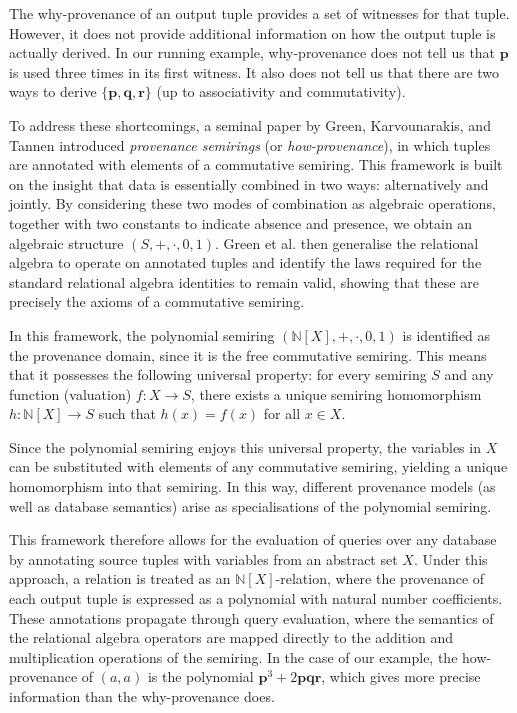 \documentclass[oneside, 11pt]{amsbook}
\theoremstyle{plain}
\theoremstyle{definition}
\theoremstyle{remark}
\begin{document}
The why-provenance of an output tuple provides a set of witnesses for that tuple. However, it does not provide additional information on how the output tuple is actually derived. In our running example, why-provenance does not tell us that $\textbf{p}$ is used three times in its first witness. It also does not tell us that there are two ways to derive $\{\textbf{p}, \textbf{q}, \textbf{r}\}$ (up to associativity and commutativity).

To address these shortcomings, a seminal paper by Green, Karvounarakis, and Tannen \cite{Green2007} introduced \emph{provenance semirings} (or \emph{how-provenance}), in which tuples are annotated with elements of a commutative semiring. This framework is built on the insight that data is essentially combined in two ways: alternatively and jointly. By considering these two modes of combination as algebraic operations, together with two constants to indicate absence and presence, we obtain an algebraic structure $(S, +, \cdot, 0, 1)$. Green et al. then generalise the relational algebra to operate on annotated tuples and identify the laws required for the standard relational algebra identities to remain valid, showing that these are precisely the axioms of a commutative semiring.

In this framework, the polynomial semiring $(\mathbb{N}[X], +, \cdot, 0, 1)$ is identified as the provenance domain, since it is the free commutative semiring. This means that it possesses the following universal property: for every semiring $S$ and any function (valuation) $f : X \to S$, there exists a unique semiring homomorphism $h : \mathbb{N}[X] \to S$ such that $h(x) = f(x)$ for all $x \in X$.

Since the polynomial semiring enjoys this universal property, the variables in $X$ can be substituted with elements of any commutative semiring, yielding a unique homomorphism into that semiring. In this way, different provenance models (as well as database semantics) arise as specialisations of the polynomial semiring.

This framework therefore allows for the evaluation of queries over any database by annotating source tuples with variables from an abstract set $X$. Under this approach, a relation is treated as an $\mathbb{N}[X]$-relation, where the provenance of each output tuple is expressed as a polynomial with natural number coefficients. These annotations propagate through query evaluation, where the semantics of the relational algebra operators are mapped directly to the addition and multiplication operations of the semiring. In the case of our example, the how-provenance of $(a,a)$ is the polynomial $\textbf{p}^3 + 2\textbf{pqr}$, which gives more precise information than the why-provenance does.
\end{document}
